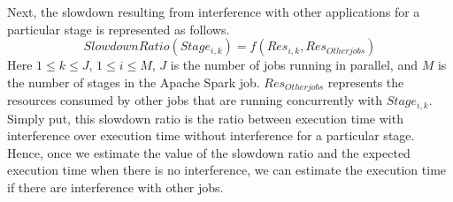 \par \noindent 
Next, the slowdown resulting from interference with other applications for a particular stage is represented as follows.
\begin{equation}
\label{slowdownratio}
SlowdownRatio(Stage_{i,k})
= f(Res_{i,k},Res_{Other jobs})
\end{equation}
\noindent
Here $1 \leq k \leq J$, $1 \leq i \leq M$, $J$ is the number of jobs running in parallel, and $M$ is the number of stages in the Apache Spark job. $Res_{Otherjobs}$ represents the resources consumed by other jobs that are running concurrently with $Stage_{i,k}$. 
Simply put, this slowdown ratio is the ratio between execution time with interference over execution time without interference for a particular stage. Hence, once we estimate the value of the slowdown ratio and the expected execution time when there is no interference, we can estimate the execution time if there are interference with other jobs. 


